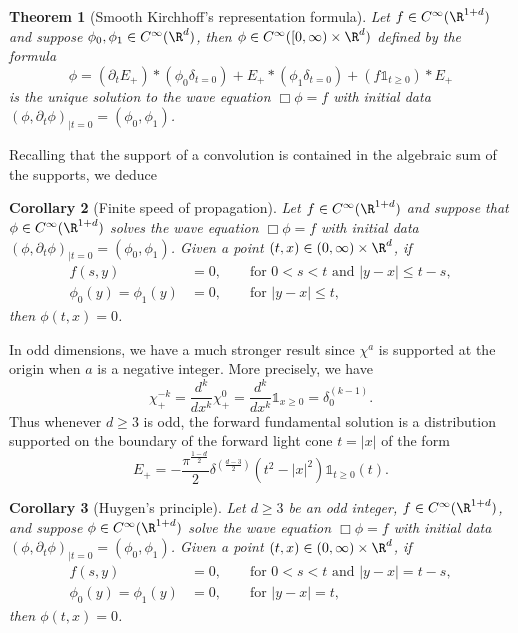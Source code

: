 \documentclass[reqno]{amsart}
\newtheorem{theorem}{Theorem}
\newtheorem{corollary}[theorem]{Corollary}
\theoremstyle{definition}
\theoremstyle{remark}
\begin{document}
\begin{theorem}[Smooth Kirchhoff's representation formula]
	Let $f \in C^\infty (\R^{1 + d})$ and suppose $\phi_0, \phi_1 \in C^\infty (\R^d)$, then $\phi \in C^\infty ([0, \infty) \times \R^d)$ defined by the formula
		\[ \phi = (\partial_t E_+) * (\phi_0 \delta_{t = 0}) + E_+ * (\phi_1 \delta_{t = 0}) + (f \mathbb 1_{t \geq 0} ) * E_+ \]
	is the unique solution to the wave equation $\Box \phi = f$ with initial data $(\phi, \partial_t \phi)_{|t = 0} = (\phi_0, \phi_1)$.
\end{theorem}

Recalling that the support of a convolution is contained in the algebraic sum of the supports, we deduce

\begin{corollary}[Finite speed of propagation]
	Let $f \in C^\infty (\R^{1 + d})$ and suppose that $\phi \in C^\infty (\R^{1 + d})$ solves the wave equation $\Box \phi = f$ with initial data $(\phi, \partial_t \phi)_{|t = 0} = (\phi_0, \phi_1)$. Given a point $(t, x) \in (0, \infty) \times \R^d$, if
		\begin{align*}
			f (s, y) 
				&= 0, \qquad \text{for $0 < s < t$ and $|y - x| \leq t - s$},\\
			\phi_0 (y) = \phi_1 (y)
				&= 0, \qquad \text{for $|y - x| \leq t$,}	
		\end{align*} 	
	then $\phi(t, x) = 0$. 	
\end{corollary}

In odd dimensions, we have a much stronger result since $\chi^a$ is supported at the origin when $a$ is a negative integer. More precisely, we have
	\[ \chi^{-k}_+  = \frac{d^k}{dx^k} \chi^0_+  = \frac{d^k}{dx^k} \mathbb 1_{x \geq 0} = \delta^{(k - 1)}_0.\]
Thus whenever $d \geq 3$ is odd, the forward fundamental solution is a distribution supported on the boundary of the forward light cone $t = |x|$ of the form
	\[ E_+ = -\frac{\pi^{\frac{1 - d}{2}}}{2} \delta^{\left(\frac{d - 3}{2} \right)} (t^2 - |x|^2) \mathbb 1_{t \geq 0} (t). \]

\begin{corollary}[Huygen's principle]
	Let $d \geq 3$ be an odd integer, $f \in C^\infty (\R^{1 + d})$, and suppose $\phi \in C^\infty (\R^{1 + d})$ solve the wave equation $\Box \phi = f$ with initial data $(\phi, \partial_t \phi)_{|t = 0} = (\phi_0, \phi_1)$. Given a point $(t, x) \in (0, \infty) \times \R^d$, if
		\begin{align*}
			f (s, y) 
				&= 0, \qquad \text{for $0 < s < t$ and $|y - x| = t - s$},\\
			\phi_0 (y) = \phi_1 (y)
				&= 0, \qquad \text{for $|y - x| = t$,}	
		\end{align*} 	
	then $\phi(t, x) = 0$. 	
\end{corollary}
\end{document}
